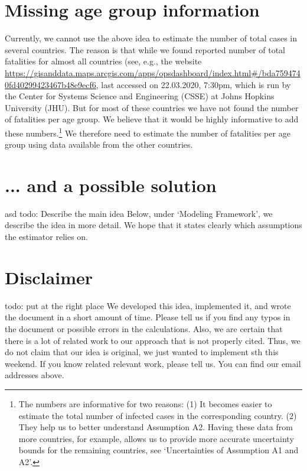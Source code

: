\documentclass[a4paper]{article}
\newcommand\todo[1]{{\color{red}todo: #1}}
\begin{document}
\section{Missing age group information} \label{sec:noage}
Currently, we cannot use the above idea to 
estimate the number of total cases in 
several countries. The reason is that 
while we found reported number of total fatalities 
for almost all countries 
(see, e.g., the website {\footnotesize
\url{https://gisanddata.maps.arcgis.com/apps/opsdashboard/index.html#/bda7594740fd40299423467b48e9ecf6}},
last accessed on 22.03.2020, 7:30pm,
which is run by the Center for Systems Science and Engineering ({CSSE}) at Johns Hopkins University ({JHU}).
But for most of these countries we have not found the number of fatalities per age group. 
We believe that it would be highly informative to add these numbers.\footnote{The numbers 
are informative for two reasons: (1) It
becomes easier to estimate the 
total number of infected cases in the 
corresponding country.
(2) They help us to better understand Assumption A2. Having these data from 
more countries, for example, 
allows us to 
provide more accurate uncertainty bounds for 
the remaining countries, see `Uncertainties of Assumption A1 and A2'.}
We therefore need to estimate the number of fatalities per age group using data available from the other countries.


\section{... and a possible solution}
asd \todo{Describe the main idea}
Below, under `Modeling Framework', we describe the idea in more detail. 
We hope that it states
clearly which assumptions the estimator
relies on.





\section{Disclaimer} \label{sec:disclaimer}
\todo{
put 
\citet{linton2020epidemiological}
at the right place}
We 
developed this idea, implemented it, and 
wrote the 
document in a short amount of time. Please tell us if you find any typos 
in the document or possible errors in 
the calculations. 
Also, we are certain that there is a lot of 
related work to our approach that is not properly cited. 
Thus, we do not claim that our idea is original, we just wanted
to implement sth this weekend.
If you know related relevant work, please tell us.
You can find our email addresses above.
\end{document}
